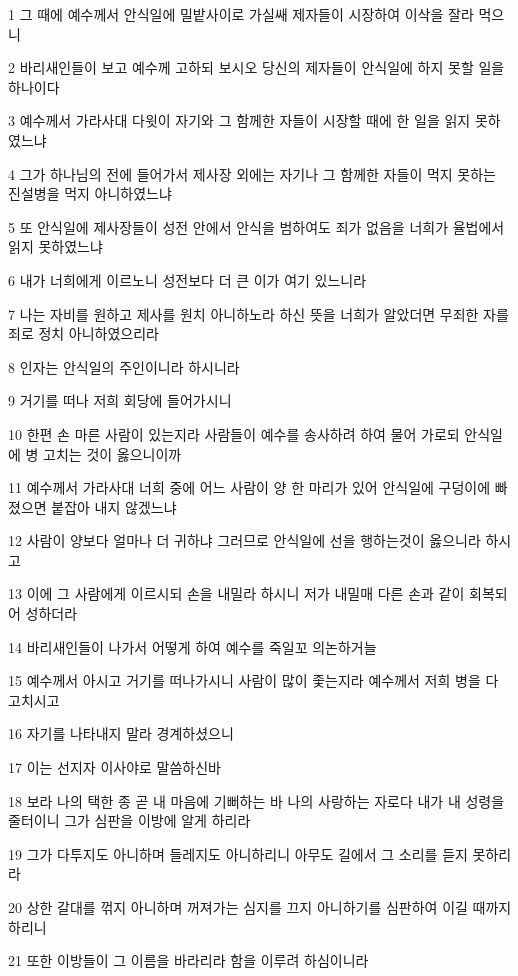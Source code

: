 \par 1 그 때에 예수께서 안식일에 밀밭사이로 가실쌔 제자들이 시장하여 이삭을 잘라 먹으니
\par 2 바리새인들이 보고 예수께 고하되 보시오 당신의 제자들이 안식일에 하지 못할 일을 하나이다
\par 3 예수께서 가라사대 다윗이 자기와 그 함께한 자들이 시장할 때에 한 일을 읽지 못하였느냐
\par 4 그가 하나님의 전에 들어가서 제사장 외에는 자기나 그 함께한 자들이 먹지 못하는 진설병을 먹지 아니하였느냐
\par 5 또 안식일에 제사장들이 성전 안에서 안식을 범하여도 죄가 없음을 너희가 율법에서 읽지 못하였느냐
\par 6 내가 너희에게 이르노니 성전보다 더 큰 이가 여기 있느니라
\par 7 나는 자비를 원하고 제사를 원치 아니하노라 하신 뜻을 너희가 알았더면 무죄한 자를 죄로 정치 아니하였으리라
\par 8 인자는 안식일의 주인이니라 하시니라
\par 9 거기를 떠나 저희 회당에 들어가시니
\par 10 한편 손 마른 사람이 있는지라 사람들이 예수를 송사하려 하여 물어 가로되 안식일에 병 고치는 것이 옳으니이까
\par 11 예수께서 가라사대 너희 중에 어느 사람이 양 한 마리가 있어 안식일에 구덩이에 빠졌으면 붙잡아 내지 않겠느냐
\par 12 사람이 양보다 얼마나 더 귀하냐 그러므로 안식일에 선을 행하는것이 옳으니라 하시고
\par 13 이에 그 사람에게 이르시되 손을 내밀라 하시니 저가 내밀매 다른 손과 같이 회복되어 성하더라
\par 14 바리새인들이 나가서 어떻게 하여 예수를 죽일꼬 의논하거늘
\par 15 예수께서 아시고 거기를 떠나가시니 사람이 많이 좇는지라 예수께서 저희 병을 다 고치시고
\par 16 자기를 나타내지 말라 경계하셨으니
\par 17 이는 선지자 이사야로 말씀하신바
\par 18 보라 나의 택한 종 곧 내 마음에 기뻐하는 바 나의 사랑하는 자로다 내가 내 성령을 줄터이니 그가 심판을 이방에 알게 하리라
\par 19 그가 다투지도 아니하며 들레지도 아니하리니 아무도 길에서 그 소리를 듣지 못하리라
\par 20 상한 갈대를 꺾지 아니하며 꺼져가는 심지를 끄지 아니하기를 심판하여 이길 때까지 하리니
\par 21 또한 이방들이 그 이름을 바라리라 함을 이루려 하심이니라
